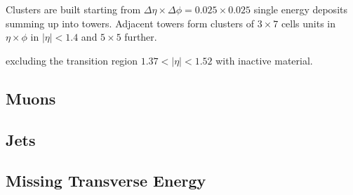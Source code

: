 Clusters are built starting from
$\Delta\eta\times\Delta\phi=0.025\times0.025$ single energy deposits summing
up into towers. Adjacent towers form clusters of $3\times7$ cells units in $\eta\times\phi$
in $|\eta|<1.4$ and $5\times5$ further.




excluding the transition region $1.37<|\eta| <1.52$
with inactive material.



\subsection{Muons}\label{sec:muons}



\subsection{Jets}\label{sec:jets}


\subsection{Missing Transverse Energy}\label{sec:met}
